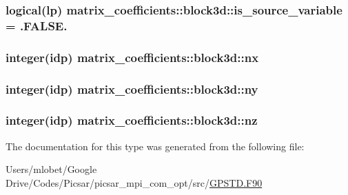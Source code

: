 \subsubsection[{\texorpdfstring{is\+\_\+source\+\_\+variable}{is_source_variable}}]{\setlength{\rightskip}{0pt plus 5cm}logical(lp) matrix\+\_\+coefficients\+::block3d\+::is\+\_\+source\+\_\+variable = .F\+A\+L\+S\+E.}\hypertarget{structmatrix__coefficients_1_1block3d_af59d38ae8117a5aae265ed57357fd9a4}{}\label{structmatrix__coefficients_1_1block3d_af59d38ae8117a5aae265ed57357fd9a4}
\subsubsection[{\texorpdfstring{nx}{nx}}]{\setlength{\rightskip}{0pt plus 5cm}integer(idp) matrix\+\_\+coefficients\+::block3d\+::nx}\hypertarget{structmatrix__coefficients_1_1block3d_af4e4f83e09cc6967c8204cd22ba39ce7}{}\label{structmatrix__coefficients_1_1block3d_af4e4f83e09cc6967c8204cd22ba39ce7}
\subsubsection[{\texorpdfstring{ny}{ny}}]{\setlength{\rightskip}{0pt plus 5cm}integer(idp) matrix\+\_\+coefficients\+::block3d\+::ny}\hypertarget{structmatrix__coefficients_1_1block3d_a5b50d6852afa142b18507bed4feaf58f}{}\label{structmatrix__coefficients_1_1block3d_a5b50d6852afa142b18507bed4feaf58f}
\subsubsection[{\texorpdfstring{nz}{nz}}]{\setlength{\rightskip}{0pt plus 5cm}integer(idp) matrix\+\_\+coefficients\+::block3d\+::nz}\hypertarget{structmatrix__coefficients_1_1block3d_aaef29da070e781dbf45d55e239521f98}{}\label{structmatrix__coefficients_1_1block3d_aaef29da070e781dbf45d55e239521f98}


The documentation for this type was generated from the following file\+:\begin{DoxyCompactItemize}
\item 
Users/mlobet/\+Google Drive/\+Codes/\+Picsar/picsar\+\_\+mpi\+\_\+com\+\_\+opt/src/\hyperlink{_g_p_s_t_d_8_f90}{G\+P\+S\+T\+D.\+F90}\end{DoxyCompactItemize}
